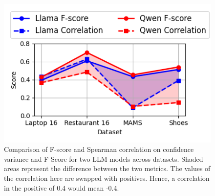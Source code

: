 \documentclass[11pt]{article}
\begin{document}
\begin{figure}[htbp]
    \centering
    \includegraphics[width=1\linewidth]{figures/corr_2.png}
    \caption{Comparison of F-score and Spearman correlation on confidence variance and F-Score for two LLM models across datasets. Shaded areas represent the difference between the two metrics. The values of the correlation here are swapped with positives. Hence, a correlation in the positive of 0.4 would mean -0.4.}
\label{fig:corr_plot_2}
\end{figure}









\end{document}
